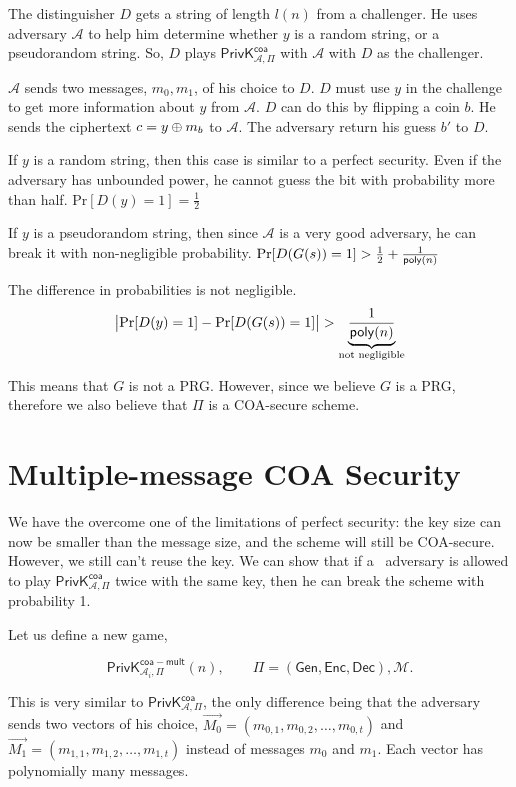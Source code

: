 \documentclass[11pt]{article}
\begin{document}
\begin{prooof}
    
    The distinguisher \(D\) gets a string of length \(l(n)\) from a challenger. He uses adversary \(\mathcal{A}\) to  help him determine whether \(y\) is a random string, or a pseudorandom string. So, \(D\) plays \(\mathsf{PrivK}^{\mathsf{coa}} _{\mathcal{A}, \Pi}\) with \(\mathcal{A}\) with \(D\) as the challenger. 
    
    \(\mathcal{A}\) sends two messages, \(m_0, m_1\), of his choice to \(D\). \(D\) must use \(y\) in the challenge to get more information about \(y\) from \(\mathcal{A}\). \(D\) can do this by flipping a coin \(b\). He sends the ciphertext \(c = y \oplus m_b\) to \(\mathcal{A}\). The adversary  return his guess \(b'\) to \(D\).
    
    If \(y\) is a random string, then this case is similar to a perfect security. Even if the adversary has unbounded power, he cannot guess the bit with probability more than half. \(\mathrm{Pr}[D(y) = 1] = \frac{1}{2}\)
    
    If \(y\) is a pseudorandom string, then since \(\mathcal{A}\) is a very good adversary, he can break it with non-negligible probability. \(\mathrm{Pr}[D(G(s)) = 1] > \frac{1}{2} + \frac{1}{{\sf poly}(n)}\)
    
    The difference in probabilities is not negligible.    
    \[ \big| \mathrm{Pr}[D(y) = 1] - \mathrm{Pr}[D(G(s)) = 1] \big| > \underbrace{\frac{1}{{\sf poly}(n)}}_\textrm{not negligible}\]

This means that \(G\) is not a PRG. However, since we believe \(G\) is a PRG, therefore we also believe that \(\Pi\) is a COA-secure scheme.
\end{prooof}

\section{Multiple-message COA Security}
We have the overcome one of the limitations of perfect security: the key size can now be smaller than the message size, and the scheme will still be COA-secure. However, we still can't reuse the key. We can show that if a \ppt\  adversary is allowed to play \(\mathsf{PrivK}^{\mathsf{coa}}_{\mathcal{A}, \Pi}\) twice with the same key, then he can break  the scheme with probability 1. 


Let us define a new game, 

\[\mathsf{PrivK}^{\mathsf{coa-mult}}_{\mathcal{A}_i, \Pi} (n), \qquad  \Pi = (\mathsf{Gen}, \mathsf{Enc}, \mathsf{Dec}), \mathcal{M}.\]

This is very similar to \(\mathsf{PrivK}^{\mathsf{coa}} _{\mathcal{A}, \Pi}\), the only difference being that the adversary sends two vectors of his choice, \(\vec{M_0} = (m_{0,1}, m_{0,2}, \ldots,  m_{0,t})\) and \(\vec{M_1} = (m_{1,1}, m_{1,2}, \ldots,  m_{1,t})\) instead of messages \(m_0\) and \(m_1\). Each vector has polynomially many messages.  
\end{document}
